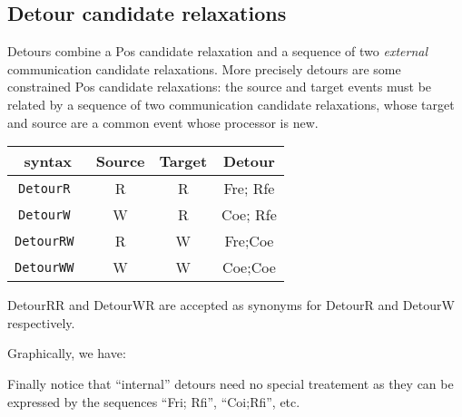 \subsection{Detour \label{detour:def}candidate relaxations}
Detours combine a Pos candidate relaxation and a sequence
of two \emph{external} communication candidate relaxations.
More precisely detours are some constrained Pos candidate relaxations:
the source and target events must be related by a sequence of
two communication candidate relaxations, whose target and source
are a common event whose processor is new.
\begin{center}
\begin{tabular}{c|c|c|c}
\diy{} syntax  &  Source & Target  & Detour \\ \hline
\tt DetourR & R & R & Fre; Rfe \\ \hline
\tt DetourW & W & R & Coe; Rfe  \\ \hline
\tt DetourRW & R & W & Fre;Coe \\ \hline
\tt DetourWW & W & W & Coe;Coe \\ \hline
\end{tabular}
\end{center}
DetourRR and DetourWR are accepted as synonyms for
DetourR and DetourW respectively.

Graphically, we have:
\begin{center}
\quad
{}\quad
{}\quad
{}
\end{center}
Finally notice that ``internal'' detours need no special treatement
as they can be expressed by the sequences ``Fri; Rfi'', ``Coi;Rfi'', etc.


